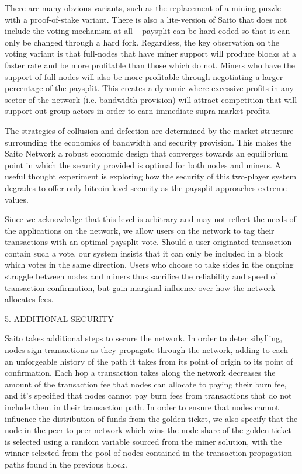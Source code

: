 \documentclass[11.5pt, oneside]{article}   	%
\begin{document}
\begin{multicols}{2}
There are many obvious variants, such as the replacement of a mining puzzle with a proof-of-stake variant. There is also a lite-version of Saito that does not include the voting mechanism at all -- paysplit can be hard-coded so that it can only be changed through a hard fork. Regardless, the key observation on the voting variant is that full-nodes that have miner support will produce blocks at a faster rate and be more profitable than those which do not. Miners who have the support of full-nodes will also be more profitable through negotiating a larger percentage of the paysplit. This creates a dynamic where excessive profits in any sector of the network (i.e. bandwidth provision) will attract competition that will support out-group actors in order to earn immediate supra-market profits. 

The strategies of collusion and defection are determined by the market structure surrounding the economics of bandwidth and security provision. This makes the Saito Network a robust economic design that converges towards an equilibrium point in which the security provided is optimal for both nodes and miners. A useful thought experiment is exploring how the security of this two-player system degrades to offer only bitcoin-level security as the paysplit approaches extreme values.
 
Since we acknowledge that this level is arbitrary and may not reflect the needs of the applications on the network, we allow users on the network to tag their transactions with an optimal paysplit vote. Should a user-originated transaction contain such a vote, our system insists that it can only be included in a block which votes in the same direction. Users who choose to take sides in the ongoing struggle between nodes and miners thus sacrifice the reliability and speed of transaction confirmation, but gain marginal influence over how the network allocates fees.

5. ADDITIONAL SECURITY

Saito takes additional steps to secure the network. In order to deter sibylling,  nodes sign transactions as they propagate through the network, adding to each an unforgeable history of the path it takes from its point of origin to its point of confirmation. Each hop a transaction takes along the network decreases the amount of the transaction fee that nodes can allocate to paying their burn fee, and it's specified that nodes cannot pay burn fees from transactions that do not include them in their transaction path. In order to ensure that nodes cannot influence the distribution of funds from the golden ticket, we also specify that the node in the peer-to-peer network which wins the node share of the golden ticket is selected using a random variable sourced from the miner solution, with the winner selected from the pool of nodes contained in the transaction propagation paths found in the previous block.


\end{multicols}
\end{document}
